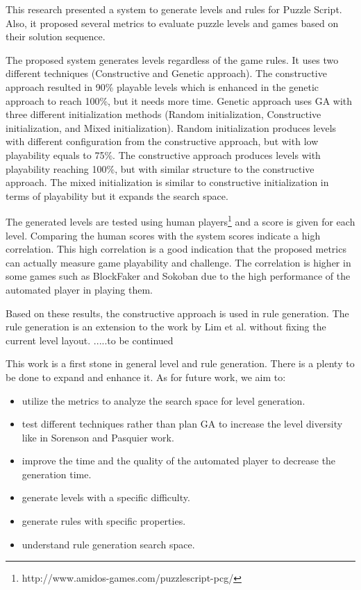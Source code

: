 This research presented a system to generate levels and rules for Puzzle Script. Also, it proposed several metrics to evaluate puzzle levels and games based on their solution sequence.\\\par

The proposed system generates levels regardless of the game rules. It uses two different techniques (Constructive and Genetic approach). The constructive approach resulted in 90\% playable levels which is enhanced in the genetic approach to reach 100\%, but it needs more time. Genetic approach uses GA with three different initialization methods (Random initialization, Constructive initialization, and Mixed initialization). Random initialization produces levels with different configuration from the constructive approach, but with low playability equals to 75\%.  The constructive approach produces levels with playability reaching 100\%, but with similar structure to the constructive approach. The mixed initialization is similar to constructive initialization in terms of playability but it expands the search space.\\\par

The generated levels are tested using human players\footnote{http://www.amidos-games.com/puzzlescript-pcg/} and a score is given for each level. Comparing the human scores with the system scores indicate a high correlation. This high correlation is a good indication that the proposed metrics can actually measure game playability and challenge. The correlation is higher in some games such as BlockFaker and Sokoban due to the high performance of the automated player in playing them.\\\par

Based on these results, the constructive approach is used in rule generation. The rule generation is an extension to the work by Lim et al.\cite{puzzleScriptGeneration} without fixing the current level layout. .....to be continued\\\par

This work is a first stone in general level and rule generation. There is a plenty to be done to expand and enhance it. As for future work, we aim to:
\begin{itemize} \itemsep0pt \parskip0pt 
	\item utilize the metrics to analyze the search space for level generation.
	\item test different techniques rather than plan GA to increase the level diversity like in Sorenson and Pasquier work\cite{genericLevelFramework}.
	\item improve the time and the quality of the automated player to decrease the generation time.
	\item generate levels with a specific difficulty.
	\item generate rules with specific properties.
	\item understand rule generation search space.
\end{itemize}